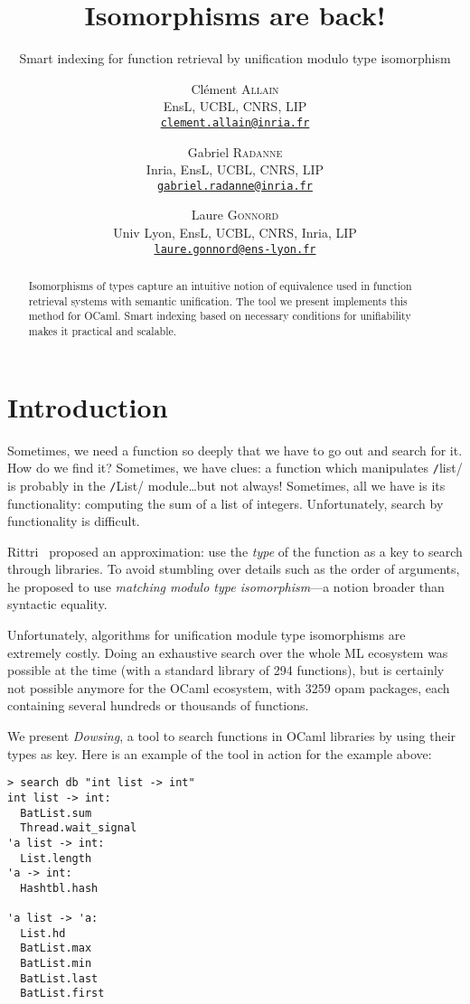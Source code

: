 \documentclass [a4paper,11pt] {scrartcl}
\title {Isomorphisms are back!}
\subtitle {Smart indexing for function retrieval by unification modulo type isomorphism}
\author {
    Clément \textsc {Allain} \\
    EnsL, UCBL, CNRS, LIP \\
    \href {mailto:clement.allain@inria.fr}
    {\nolinkurl {clement.allain@inria.fr}}
  \and
  \and
    Gabriel \textsc {Radanne} \\
    Inria, EnsL, UCBL, CNRS, LIP \\
    \href {mailto:gabriel.radanne@inria.fr}
    {\nolinkurl {gabriel.radanne@inria.fr}}
  \and
    Laure \textsc {Gonnord} \\
    Univ Lyon, EnsL, UCBL, CNRS, Inria, LIP \\
    \href {mailto:laure.gonnord@ens-lyon.fr}
    {\nolinkurl {laure.gonnord@ens-lyon.fr}}
}
\date {}
\newcommand {\dowsing} {\textit {Dowsing}\xspace}
\begin{document}
\maketitle


\begin {abstract}
  Isomorphisms of types capture an intuitive notion of equivalence used in function retrieval systems with semantic unification. The tool we present implements this method for OCaml. Smart indexing based on necessary conditions for unifiability makes it practical and scalable.
\end {abstract}


\section {Introduction}

Sometimes, we need a function so deeply that we have to go out and search for it.
How do we find it? Sometimes, we have clues: a function which manipulates \texttt/list/ is probably in the \texttt/List/ module\dots but not always!
Sometimes, all we have is its functionality: computing the sum of a list of integers.
Unfortunately, search by functionality is difficult.

Rittri~\cite{rittri} proposed an approximation: use the \emph{type} of the function as a key to search through libraries.
To avoid stumbling over details such as the order of arguments, he proposed to use \emph{matching modulo type isomorphism}---a notion broader than syntactic equality.

Unfortunately, algorithms for unification module type isomorphisms are extremely
costly. Doing an exhaustive search over the whole ML ecosystem
was possible at the time (with a standard library of 294 functions),
but is certainly not possible anymore for the OCaml ecosystem,
with 3259 opam packages, each containing several hundreds or thousands of
functions.

We present \dowsing, a tool to search functions in OCaml libraries by
using their types as key.
Here is an example of the tool in action for the example above:

\begin{lstlisting}[multicols=2]
> search db "int list -> int"
int list -> int:
  BatList.sum
  Thread.wait_signal
'a list -> int:
  List.length
'a -> int:
  Hashtbl.hash

'a list -> 'a:
  List.hd
  BatList.max
  BatList.min
  BatList.last
  BatList.first
\end{lstlisting}
\end{document}
